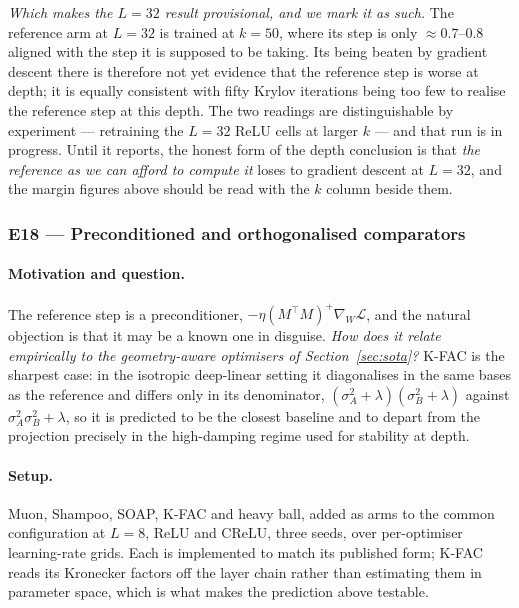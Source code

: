 \documentclass{article} %
\theoremstyle{plain}
\theoremstyle{definition}
\theoremstyle{remark}
\begin{document}
\emph{Which makes the $L = 32$ result provisional, and we mark it as such.} The reference arm at
$L = 32$ is trained at $k = 50$, where its step is only $\approx 0.7$--$0.8$ aligned with the step
it is supposed to be taking. Its being beaten by gradient descent there is therefore not yet
evidence that the reference step is worse at depth; it is equally consistent with fifty Krylov
iterations being too few to realise the reference step at this depth. The two readings are
distinguishable by experiment --- retraining the $L = 32$ ReLU cells at larger $k$ --- and that run
is in progress. Until it reports, the honest form of the depth conclusion is that \emph{the
reference as we can afford to compute it} loses to gradient descent at $L = 32$, and the margin
figures above should be read with the $k$ column beside them.

\subsubsection{E18 --- Preconditioned and orthogonalised comparators}
\label{sec:e18}

\paragraph{Motivation and question.}
The reference step is a preconditioner, $-\eta (M^\top M)^{+}\nabla_W \mathcal{L}$, and the natural
objection is that it may be a known one in disguise. \emph{How does it relate empirically to the
geometry-aware optimisers of Section~\ref{sec:sota}?} K-FAC is the sharpest case: in the
isotropic deep-linear setting it diagonalises in the same bases as the reference and differs only in
its denominator, $(\sigma_A^2 + \lambda)(\sigma_B^2 + \lambda)$ against
$\sigma_A^2 \sigma_B^2 + \lambda$, so it is predicted to be the closest baseline and to depart from
the projection precisely in the high-damping regime used for stability at depth.

\paragraph{Setup.}
Muon, Shampoo, SOAP, K-FAC and heavy ball, added as arms to the common configuration at $L = 8$,
ReLU and CReLU, three seeds, over per-optimiser learning-rate grids. Each is implemented to match
its published form; K-FAC reads its Kronecker factors off the layer chain rather than estimating
them in parameter space, which is what makes the prediction above testable.
\end{document}
